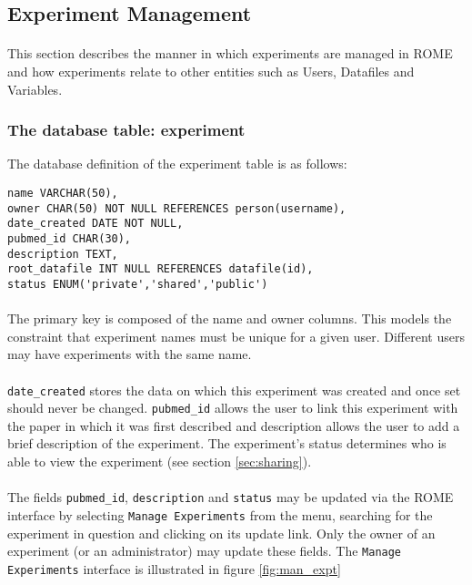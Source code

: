 \subsection{Experiment Management}
\label{experiment_management}

\paragraph{}
This section describes the manner in which experiments are managed in ROME and how experiments relate to other entities such as Users, Datafiles and Variables.

\subsubsection{The database table: experiment}

The database definition of the experiment table is as follows:

\begin{footnotesize}
\begin{verbatim}	
name VARCHAR(50),
owner CHAR(50) NOT NULL REFERENCES person(username),
date_created DATE NOT NULL,
pubmed_id CHAR(30),
description TEXT,
root_datafile INT NULL REFERENCES datafile(id),
status ENUM('private','shared','public')
\end{verbatim}
\end{footnotesize}

\paragraph{}
The primary key is composed of the name and owner columns. This models the constraint that experiment names must be unique for a given user. Different users may have experiments with the same name.

\paragraph{}
\texttt{date\_created} stores the data on which this experiment was created and once set should never be changed. \texttt{pubmed\_id} allows the user to link this experiment with the paper in which it was first described and description allows the user to add a brief description of the experiment. The experiment's status determines who is able to view the experiment (see section \ref{sec:sharing}). 

\paragraph{}
The fields \texttt{pubmed\_id}, \texttt{description} and \texttt{status} may be updated via the ROME interface by selecting \texttt{Manage Experiments} from the menu, searching for the experiment in question and clicking on its update link. Only the owner of an experiment (or an administrator) may update these fields. The \texttt{Manage Experiments} interface is illustrated in figure \ref{fig:man_expt}

